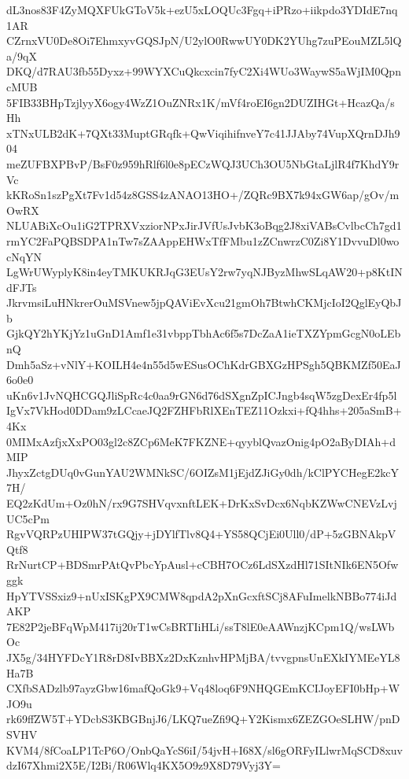 dL3nos83F4ZyMQXFUkGToV5k+ezU5xLOQUc3Fgq+iPRzo+iikpdo3YDIdE7nq1AR
CZrnxVU0De8Oi7EhmxyvGQSJpN/U2ylO0RwwUY0DK2YUhg7zuPEouMZL5lQa/9qX
DKQ/d7RAU3fb55Dyxz+99WYXCuQkcxcin7fyC2Xi4WUo3WaywS5aWjIM0QpncMUB
5FIB33BHpTzjlyyX6ogy4WzZ1OuZNRx1K/mVf4roEI6gn2DUZIHGt+HcazQa/sHh
xTNxULB2dK+7QXt33MuptGRqfk+QwViqihifnveY7c41JJAby74VupXQrnDJh904
meZUFBXPBvP/BsF0z959hRlf6l0e8pECzWQJ3UCh3OU5NbGtaLjlR4f7KhdY9rVc
kKRoSn1szPgXt7Fv1d54z8GSS4zANAO13HO+/ZQRc9BX7k94xGW6ap/gOv/mOwRX
NLUABiXcOu1iG2TPRXVxziorNPxJirJVfUsJvbK3oBqg2J8xiVABsCvlbcCh7gd1
rmYC2FaPQBSDPA1nTw7sZAAppEHWxTfFMbu1zZCnwrzC0Zi8Y1DvvuDl0wocNqYN
LgWrUWyplyK8in4eyTMKUKRJqG3EUsY2rw7yqNJByzMhwSLqAW20+p8KtINdFJTs
JkrvmsiLuHNkrerOuMSVnew5jpQAViEvXcu21gmOh7BtwhCKMjcIoI2QglEyQbJb
GjkQY2hYKjYz1uGnD1Amf1e31vbppTbhAc6f5s7DcZaA1ieTXZYpmGcgN0oLEbnQ
Dmh5aSz+vNlY+KOILH4e4n55d5wESusOChKdrGBXGzHPSgh5QBKMZf50EaJ6o0e0
uKn6v1JvNQHCGQJliSpRc4c0aa9rGN6d76dSXgnZpICJngb4sqW5zgDexEr4fp5l
IgVx7VkHod0DDam9zLCcaeJQ2FZHFbRlXEnTEZ11Ozkxi+fQ4hhs+205aSmB+4Kx
0MIMxAzfjxXxPO03gl2c8ZCp6MeK7FKZNE+qyyblQvazOnig4pO2aByDIAh+dMIP
JhyxZctgDUq0vGunYAU2WMNkSC/6OIZsM1jEjdZJiGy0dh/kClPYCHegE2kcY7H/
EQ2zKdUm+Oz0hN/rx9G7SHVqvxnftLEK+DrKxSvDcx6NqbKZWwCNEVzLvjUC5cPm
RgvVQRPzUHIPW37tGQjy+jDYlfTlv8Q4+YS58QCjEi0Ull0/dP+5zGBNAkpVQtf8
RrNurtCP+BDSmrPAtQvPbcYpAusl+cCBH7OCz6LdSXzdHl71SItNIk6EN5Ofwggk
HpYTVSSxiz9+nUxISKgPX9CMW8qpdA2pXnGcxftSCj8AFuImelkNBBo774iJdAKP
7E82P2jeBFqWpM417ij20rT1wCsBRTIiHLi/ssT8lE0eAAWnzjKCpm1Q/wsLWbOc
JX5g/34HYFDcY1R8rD8IvBBXz2DxKznhvHPMjBA/tvvgpnsUnEXkIYMEeYL8Ha7B
CXfbSADzlb97ayzGbw16mafQoGk9+Vq48loq6F9NHQGEmKCIJoyEFI0bHp+WJO9u
rk69ffZW5T+YDcbS3KBGBnjJ6/LKQ7ueZfi9Q+Y2Kismx6ZEZGOeSLHW/pnDSVHV
KVM4/8fCoaLP1TcP6O/OnbQaYcS6iI/54jvH+I68X/sl6gORFyILlwrMqSCD8xuv
dzI67Xhmi2X5E/I2Bi/R06Wlq4KX5O9z9X8D79Vyj3Y=
